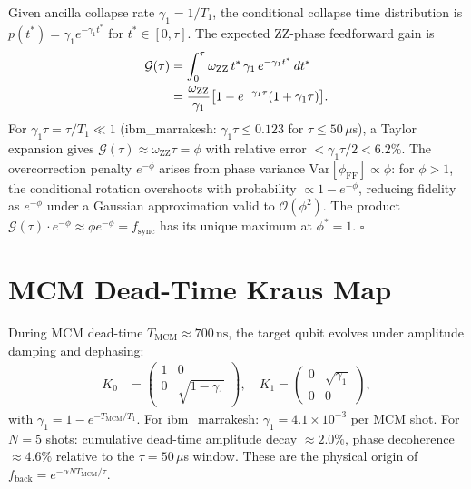 \documentclass[10pt,twocolumn]{article}
\newcommand{\oZZ}{\omega_{\mathrm{ZZ}}}
\newcommand{\Tmc}{T_{\mathrm{MCM}}}
\begin{document}
Given ancilla collapse rate $\gamma_1 = 1/T_1$, the conditional collapse
time distribution is $p(t^*) = \gamma_1 e^{-\gamma_1 t^*}$
for $t^* \in [0,\tau]$.
The expected ZZ-phase feedforward gain is
\begin{align}
  \mathcal{G}(\tau) &= \int_0^\tau \oZZ\,t^*\,\gamma_1\,e^{-\gamma_1 t^*}\,dt^*
  \notag\\
  &= \frac{\oZZ}{\gamma_1}\bigl[1 - e^{-\gamma_1\tau}(1+\gamma_1\tau)\bigr].
  \label{eq:Gintegral}
\end{align}
For $\gamma_1\tau = \tau/T_1 \ll 1$ (ibm\_marrakesh: $\gamma_1\tau \le 0.123$
for $\tau \le 50\,\mu$s), a Taylor expansion gives
$\mathcal{G}(\tau) \approx \oZZ\tau = \phi$ with
relative error $< \gamma_1\tau/2 < 6.2\%$.
The overcorrection penalty $e^{-\phi}$ arises from phase variance
$\mathrm{Var}[\phi_\mathrm{FF}] \propto \phi$: for $\phi > 1$,
the conditional rotation overshoots with probability $\propto 1 - e^{-\phi}$,
reducing fidelity as $e^{-\phi}$ under a Gaussian approximation valid
to $\mathcal{O}(\phi^2)$.
The product $\mathcal{G}(\tau) \cdot e^{-\phi}
\approx \phi e^{-\phi} = f_\mathrm{sync}$
has its unique maximum at $\phi^* = 1$. $\square$

\section{MCM Dead-Time Kraus Map}
\label{app:deadtime}

During MCM dead-time $\Tmc \approx 700\,\mathrm{ns}$, the target qubit
evolves under amplitude damping and dephasing:
\begin{align}
  K_0 &= \begin{pmatrix}1 & 0 \\ 0 & \sqrt{1-\gamma_1}\end{pmatrix},\quad
  K_1  = \begin{pmatrix}0 & \sqrt{\gamma_1} \\ 0 & 0\end{pmatrix},
\end{align}
with $\gamma_1 = 1-e^{-\Tmc/T_1}$.
For ibm\_marrakesh: $\gamma_1 = 4.1\times10^{-3}$ per MCM shot.
For $N=5$ shots: cumulative dead-time amplitude decay $\approx 2.0\%$,
phase decoherence $\approx 4.6\%$ relative to the $\tau=50\,\mu$s window.
These are the physical origin of $f_\mathrm{back} = e^{-\alpha N\Tmc/\tau}$.
\end{document}
